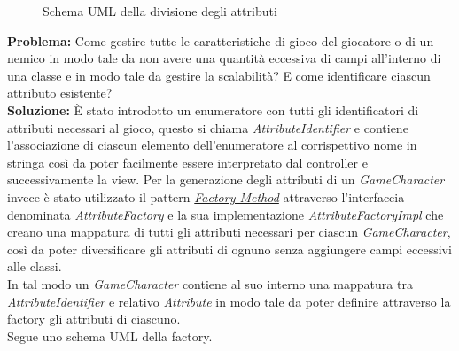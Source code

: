\documentclass[a4paper,12pt]{report}
\begin{document}
\begin{figure}[H]
	\centering
	
	\caption{Schema UML della divisione degli attributi}
	\label{fig:Schema UML della divisione degli attributi}
\end{figure}

\textbf{Problema:} Come gestire tutte le caratteristiche di gioco del giocatore o di un nemico in modo tale da non avere una quantità eccessiva di campi all'interno di una classe e in modo tale da gestire la scalabilità? E come identificare ciascun attributo esistente?\\
\textbf{Soluzione:} È stato introdotto un enumeratore con tutti gli identificatori di attributi necessari al gioco, questo si chiama \textit{AttributeIdentifier} e contiene l'associazione di ciascun elemento dell'enumeratore al corrispettivo nome in stringa così da poter facilmente essere interpretato dal controller e successivamente la view.
Per la generazione degli attributi di un \textit{GameCharacter} invece è stato utilizzato il pattern \href{https://refactoring.guru/design-patterns/factory-method}{\textit{Factory Method}} attraverso l'interfaccia denominata \textit{AttributeFactory} e la sua implementazione \textit{AttributeFactoryImpl} che creano una mappatura di tutti gli attributi necessari per ciascun \textit{GameCharacter}, così da poter diversificare gli attributi di ognuno senza aggiungere campi eccessivi alle classi.\\
In tal modo un \textit{GameCharacter} contiene al suo interno una mappatura tra \textit{AttributeIdentifier} e relativo \textit{Attribute} in modo tale da poter definire attraverso la factory gli attributi di ciascuno.\\ Segue uno schema UML della factory.
\end{document}
